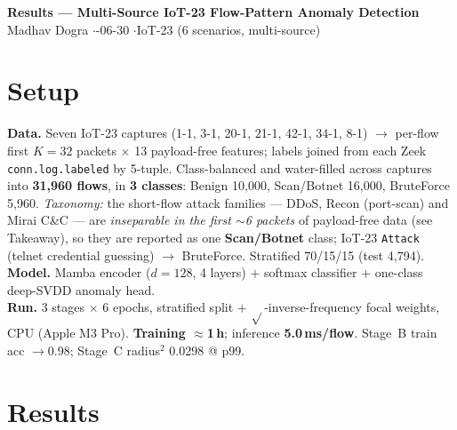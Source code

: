 \documentclass[11pt,a4paper]{article}
\newcommand{\hd}[1]{\textbf{\textcolor{accent}{#1}}}
\begin{document}
\begin{center}
{\Large\bfseries Results --- Multi-Source IoT-23 Flow-Pattern Anomaly Detection} \\[2pt]
{\small Madhav Dogra \quad$\cdot$-06-30 \quad$\cdot$\quad IoT-23 (6 scenarios, multi-source)}
\end{center}
\vspace{-2pt}

\section*{Setup}
\hd{Data.} Seven IoT-23 captures (1-1, 3-1, 20-1, 21-1, 42-1, 34-1, 8-1) $\rightarrow$ per-flow first $K{=}32$ packets $\times$ 13 payload-free features; labels joined from each Zeek \texttt{conn.log.labeled} by 5-tuple. Class-balanced and water-filled across captures into \textbf{31{,}960 flows}, in \textbf{3 classes}: Benign 10{,}000, Scan/Botnet 16{,}000, BruteForce 5{,}960. \emph{Taxonomy:} the short-flow attack families --- DDoS, Recon (port-scan) and Mirai C\&C --- are \emph{inseparable in the first $\sim$6 packets} of payload-free data (see Takeaway), so they are reported as one \textbf{Scan/Botnet} class; IoT-23 \texttt{Attack} (telnet credential guessing) $\rightarrow$ BruteForce. Stratified 70/15/15 (test 4{,}794).\\
\hd{Model.} Mamba encoder ($d{=}128$, 4 layers) $+$ softmax classifier $+$ one-class deep-SVDD anomaly head.\\
\hd{Run.} 3 stages $\times$ 6 epochs, stratified split $+$ $\sqrt{}$-inverse-frequency focal weights, CPU (Apple M3 Pro). \textbf{Training $\approx$1\,h}; inference \textbf{5.0\,ms/flow}. Stage~B train acc $\rightarrow$0.98; Stage~C radius$^2$ 0.0298 @ p99.

\section*{Results}
\end{document}

